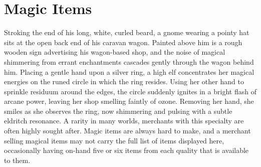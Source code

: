 \documentclass[10pt,a4paper,twoside,twocolumn,openany,nodeprecatedcode,bg=print]{dndbook}
\begin{document}
\section{Magic Items}
Stroking the end of his long, white, curled beard, a gnome wearing a pointy hat sits at the open back end of his caravan wagon. Painted above him is a rough wooden sign advertising his wagon-based shop, and the noise of magical shimmering from errant enchantments cascades gently through the wagon behind him.
Placing a gentle hand upon a silver ring, a high elf concentrates her magical energies on the runed circle in which the ring resides. Using her other hand to sprinkle residuum around the edges, the circle suddenly ignites in a bright flash of arcane power, leaving her shop smelling faintly of ozone. Removing her hand, she smiles as she observes the ring, now shimmering and pulsing with a subtle eldritch resonance.
A rarity in many worlds, merchants with this specialty are often highly sought after. Magic items are always hard to make, and a merchant selling magical items may not carry the full list of items displayed here, occasionally having on-hand five or six items from each quality that is available to them.
\end{document}
